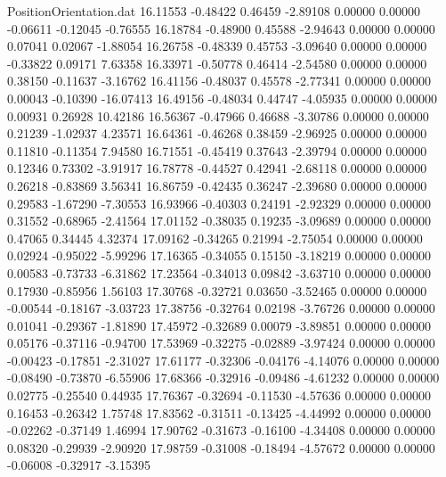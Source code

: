 \begin{filecontents}{PositionOrientation.dat}
  16.11553   -0.48422    0.46459    -2.89108    0.00000    0.00000   -0.06611   -0.12045   -0.76555
  16.18784   -0.48900    0.45588    -2.94643    0.00000    0.00000    0.07041    0.02067   -1.88054
  16.26758   -0.48339    0.45753    -3.09640    0.00000    0.00000   -0.33822    0.09171    7.63358
  16.33971   -0.50778    0.46414    -2.54580    0.00000    0.00000    0.38150   -0.11637   -3.16762
  16.41156   -0.48037    0.45578    -2.77341    0.00000    0.00000    0.00043   -0.10390  -16.07413
  16.49156   -0.48034    0.44747    -4.05935    0.00000    0.00000    0.00931    0.26928   10.42186
  16.56367   -0.47966    0.46688    -3.30786    0.00000    0.00000    0.21239   -1.02937    4.23571
  16.64361   -0.46268    0.38459    -2.96925    0.00000    0.00000    0.11810   -0.11354    7.94580
  16.71551   -0.45419    0.37643    -2.39794    0.00000    0.00000    0.12346    0.73302   -3.91917
  16.78778   -0.44527    0.42941    -2.68118    0.00000    0.00000    0.26218   -0.83869    3.56341
  16.86759   -0.42435    0.36247    -2.39680    0.00000    0.00000    0.29583   -1.67290   -7.30553
  16.93966   -0.40303    0.24191    -2.92329    0.00000    0.00000    0.31552   -0.68965   -2.41564
  17.01152   -0.38035    0.19235    -3.09689    0.00000    0.00000    0.47065    0.34445    4.32374
  17.09162   -0.34265    0.21994    -2.75054    0.00000    0.00000    0.02924   -0.95022   -5.99296
  17.16365   -0.34055    0.15150    -3.18219    0.00000    0.00000    0.00583   -0.73733   -6.31862
  17.23564   -0.34013    0.09842    -3.63710    0.00000    0.00000    0.17930   -0.85956    1.56103
  17.30768   -0.32721    0.03650    -3.52465    0.00000    0.00000   -0.00544   -0.18167   -3.03723
  17.38756   -0.32764    0.02198    -3.76726    0.00000    0.00000    0.01041   -0.29367   -1.81890
  17.45972   -0.32689    0.00079    -3.89851    0.00000    0.00000    0.05176   -0.37116   -0.94700
  17.53969   -0.32275   -0.02889    -3.97424    0.00000    0.00000   -0.00423   -0.17851   -2.31027
  17.61177   -0.32306   -0.04176    -4.14076    0.00000    0.00000   -0.08490   -0.73870   -6.55906
  17.68366   -0.32916   -0.09486    -4.61232    0.00000    0.00000    0.02775   -0.25540    0.44935
  17.76367   -0.32694   -0.11530    -4.57636    0.00000    0.00000    0.16453   -0.26342    1.75748
  17.83562   -0.31511   -0.13425    -4.44992    0.00000    0.00000   -0.02262   -0.37149    1.46994
  17.90762   -0.31673   -0.16100    -4.34408    0.00000    0.00000    0.08320   -0.29939   -2.90920
  17.98759   -0.31008   -0.18494    -4.57672    0.00000    0.00000   -0.06008   -0.32917   -3.15395

\end{filecontents}
